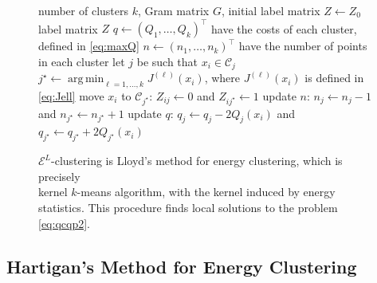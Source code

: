 \documentclass[aps,preprint,nofootinbib,floatfix]{revtex4-1}
\DeclareMathOperator*{\argmin}{arg\,min}
\newcommand\C{{\mathcal{C}}}
\begin{document}
\begin{figure}
\begin{flushleft}
\begin{algorithm}[H]
\vspace{.5em}
\begin{algorithmic}[1]
    \INPUT number of clusters $k$, Gram matrix $G$, initial label
    matrix $Z \leftarrow Z_0$
    \OUTPUT label matrix $Z$ 
  \STATE $q \leftarrow (Q_1, \dotsc, Q_k)^\top$ 
            have the costs of each cluster, defined in \eqref{eq:maxQ}
  \STATE $n \leftarrow (n_1,\dotsc,n_k)^\top$ 
        have the number of points in each cluster%
  \REPEAT
        \STATE let $j$ be such that $x_i \in \C_j$
        \STATE $j^\star \leftarrow \argmin_{\ell=1,\dotsc,k} J^{(\ell)}(x_i)$,
            where $J^{(\ell)}(x_i)$ is defined in \eqref{eq:Jell}
            \STATE move $x_i$ to $\C_{j^\star}$: $Z_{ij} \leftarrow 0$ and
            $Z_{ij^\star} \leftarrow 1$
            \STATE update $n$: $n_j \leftarrow n_j - 1$ and
                    $n_{j^\star} \leftarrow n_{j^\star} + 1$
            \STATE update $q$: $q_j \leftarrow q_j - 2Q_j(x_i)$ and
    $q_{j^\star} \leftarrow q_{j^\star} + 2Q_{j^\star}(x_i)$
        \ENDIF
    \ENDFOR
\end{algorithmic}
\caption{\label{kmeans_algo}
$\mathcal{E}^{L}$-clustering is Lloyd's method for energy clustering, which
is precisely~~~~~~~~ \\ 
kernel $k$-means algorithm, with the kernel induced by energy statistics. This procedure finds
local solutions to the problem \eqref{eq:qcqp2}.\hspace{\fill}
}
\end{algorithm}
\end{flushleft}
\end{figure}

\subsection*{Hartigan's Method for Energy Clustering}

\end{document}

